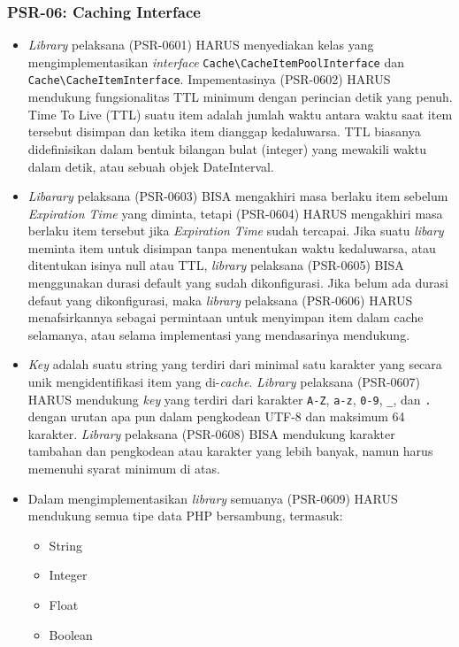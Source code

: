 \subsubsection{PSR-06: Caching Interface}
\label{subsubsec:psr06}
\begin{itemize}
	\item \textit{Library} pelaksana (PSR-0601) HARUS menyediakan kelas yang mengimplementasikan \textit{interface} \verb|Cache\CacheItemPoolInterface| dan \verb|Cache\CacheItemInterface|. Impementasinya (PSR-0602) HARUS mendukung fungsionalitas TTL minimum dengan perincian detik yang penuh. Time To Live (TTL) suatu item adalah jumlah waktu antara waktu saat item tersebut disimpan dan ketika item dianggap kedaluwarsa. TTL biasanya didefinisikan dalam bentuk bilangan bulat (integer) yang mewakili waktu dalam detik, atau sebuah objek DateInterval.
	\item \textit{Libarary} pelaksana (PSR-0603) BISA mengakhiri masa berlaku item sebelum \textit{Expiration Time} yang diminta, tetapi (PSR-0604) HARUS mengakhiri masa berlaku item tersebut jika \textit{Expiration Time} sudah tercapai. Jika suatu \textit{libary} meminta item untuk disimpan tanpa menentukan waktu kedaluwarsa, atau ditentukan isinya null atau TTL,  \textit{library} pelaksana (PSR-0605) BISA menggunakan durasi default yang sudah dikonfigurasi. Jika belum ada durasi defaut yang dikonfigurasi, maka \textit{library} pelaksana (PSR-0606) HARUS menafsirkannya sebagai permintaan untuk menyimpan item dalam cache selamanya, atau selama implementasi yang mendasarinya mendukung.
	\item \textit{Key} adalah suatu string yang terdiri dari minimal satu karakter yang secara unik mengidentifikasi item yang di-\textit{cache}. \textit{Library} pelaksana (PSR-0607) HARUS mendukung \textit{key} yang terdiri dari karakter \verb|A-Z|, \verb|a-z|, \verb|0-9|, \verb|_|, dan \verb|.| dengan urutan apa pun dalam pengkodean UTF-8 dan maksimum 64 karakter. \textit{Library} pelaksana (PSR-0608) BISA mendukung karakter tambahan dan pengkodean atau karakter yang lebih banyak, namun harus memenuhi syarat minimum di atas.
	\item Dalam mengimplementasikan \textit{library} semuanya (PSR-0609) HARUS mendukung semua tipe data PHP bersambung, termasuk: 
	\begin{itemize}
		\item String
		\item Integer
		\item Float
		\item Boolean

\end{itemize}
\end{itemize}
